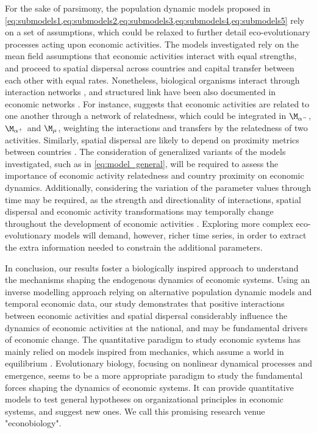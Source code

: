 For the sake of parsimony, the population dynamic models proposed in \cref{eq:submodels1,eq:submodels2,eq:submodels3,eq:submodels4,eq:submodels5} rely on a set of assumptions, which could be relaxed to further detail eco-evolutionary processes acting upon economic activities. 
% 
The models investigated rely on the mean field assumptions that economic activities interact with equal strengths, and proceed to spatial dispersal across countries and capital transfer between each other with equal rates.
% 
Nonetheless, biological organisms interact through interaction networks \citep{Bascompte2003}, and structured link have been also documented in economic networks  \citep{C.A.HidalgoB.Klinger,Bustos2012,Saavedra2009a,Schweitzer2009,Giuliani2007}. For instance, \cite{C.A.HidalgoB.Klinger} suggests that economic activities are related to one another through a network of relatedness, which could be integrated in $\modalphan$, $\modalphap$ and $\modmu$, weighting the interactions and transfers by the relatedness of two activities. 
% 
% 
Similarly, spatial dispersal are likely to depend on proximity metrics between countries \citep{Boschma2005}. The consideration of generalized variants of the models investigated, such as in \cref{eq:model_general}, will be required to assess the importance of economic activity relatedness and country proximity on economic dynamics. Additionally, considering the variation of the parameter values through time may be required, as the strength and directionality of interactions, spatial dispersal and economic activity transformations may temporally change throughout the development of economic activities \citep{Pistorius1997}. 
% 
Exploring more complex eco-evolutionary models will demand, however, richer time series, in order to extract the extra information needed to constrain the additional parameters.

In conclusion, our results foster a biologically inspired approach to understand the mechanisms shaping the endogenous dynamics of economic systems. Using an inverse modelling approach relying on alternative population dynamic models and temporal economic data, our study demonstrates that positive interactions between economic activities and spatial dispersal considerably influence the dynamics of economic activities at the national, and may be fundamental drivers of economic change.
% 
The quantitative paradigm to study economic systems has mainly relied on models inspired from mechanics, which assume a world in equilibrium \citep{sornette2014physics}.
% 
Evolutionary biology, focusing on nonlinear dynamical processes and emergence, seems to be a more appropriate paradigm to study the fundamental forces shaping the dynamics of economic systems. It can provide quantitative models to test general hypotheses on organizational principles in economic systems, and suggest new ones. We call this promising research venue "econobiology".


